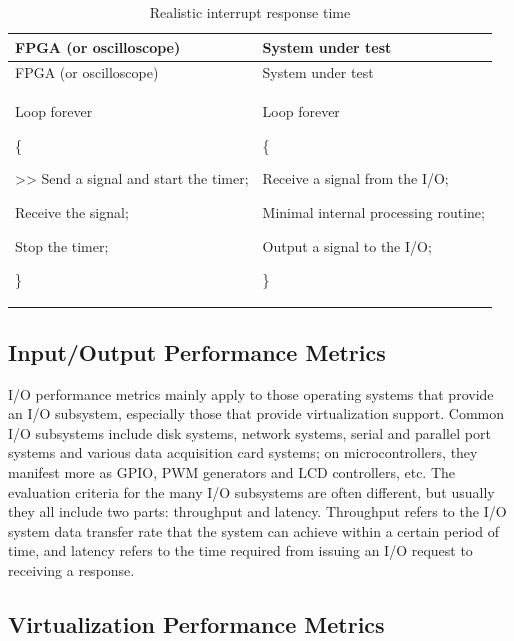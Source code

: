 \begin{xltabular}{\textwidth}{@{}>{\hsize\raggedright\arraybackslash}X>{\hsize\raggedright\arraybackslash}X@{}}
\caption{Realistic interrupt response time}\label{tab:1-13-actual-interrupt-response-time}\\
\toprule
FPGA (or oscilloscope) & System under test\tabularnewline
\endfirsthead
\toprule
FPGA (or oscilloscope) & System under test\tabularnewline
\midrule
\endhead
\bottomrule
\endlastfoot
Loop forever

\{

\textgreater\textgreater{} Send a signal and start the timer;

Receive the signal;

Stop the timer;

\}\strut
 & Loop forever

\{

Receive a signal from the I/O;

Minimal internal processing routine;

Output a signal to the I/O;

\}\strut
\tabularnewline
\end{xltabular}
\nopagebreak[4]

\subsection{Input/Output Performance Metrics}\label{subsec:1-io-performance-metrics}

I/O performance metrics mainly apply to those operating systems that provide an I/O subsystem, especially those that provide virtualization support. Common I/O subsystems include disk systems, network systems, serial and parallel port systems and various data acquisition card systems; on microcontrollers, they manifest more as GPIO, PWM generators and LCD controllers, etc. The evaluation criteria for the many I/O subsystems are often different, but usually they all include two parts: throughput and latency. Throughput refers to the I/O system data transfer rate that the system can achieve within a certain period of time, and latency refers to the time required from issuing an I/O request to receiving a response.

\subsection{Virtualization Performance Metrics}\label{subsec:1-virtualization-performance-metrics}

